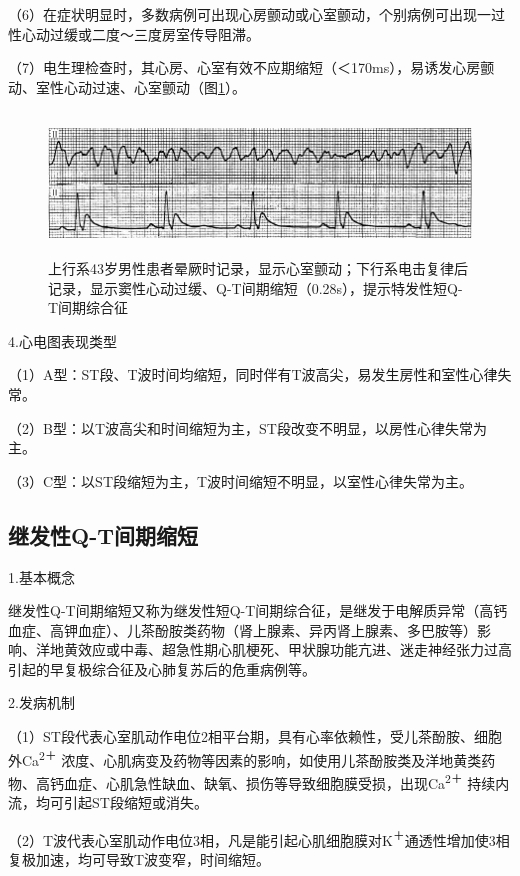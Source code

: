 （6）在症状明显时，多数病例可出现心房颤动或心室颤动，个别病例可出现一过性心动过缓或二度～三度房室传导阻滞。

（7）电生理检查时，其心房、心室有效不应期缩短（＜170ms），易诱发心房颤动、室性心动过速、心室颤动（图\ref{fig7-4}）。

\begin{figure}[!htbp]
 \centering
 \includegraphics[width=5.78125in,height=1.48958in]{./images/Image00117.jpg}
 \captionsetup{justification=centering}
 \caption{上行系43岁男性患者晕厥时记录，显示心室颤动；下行系电击复律后记录，显示窦性心动过缓、Q-T间期缩短（0.28s），提示特发性短Q-T间期综合征}
 \label{fig7-4}
  \end{figure} 

4.心电图表现类型

（1）A型：ST段、T波时间均缩短，同时伴有T波高尖，易发生房性和室性心律失常。

（2）B型：以T波高尖和时间缩短为主，ST段改变不明显，以房性心律失常为主。

（3）C型：以ST段缩短为主，T波时间缩短不明显，以室性心律失常为主。

\protect\hypertarget{text00013.htmlux5cux23subid106}{}{}

\subsection{继发性Q-T间期缩短}

1.基本概念

继发性Q-T间期缩短又称为继发性短Q-T间期综合征，是继发于电解质异常（高钙血症、高钾血症）、儿茶酚胺类药物（肾上腺素、异丙肾上腺素、多巴胺等）影响、洋地黄效应或中毒、超急性期心肌梗死、甲状腺功能亢进、迷走神经张力过高引起的早复极综合征及心肺复苏后的危重病例等。

2.发病机制

（1）ST段代表心室肌动作电位2相平台期，具有心率依赖性，受儿茶酚胺、细胞外Ca\textsuperscript{2＋}
浓度、心肌病变及药物等因素的影响，如使用儿茶酚胺类及洋地黄类药物、高钙血症、心肌急性缺血、缺氧、损伤等导致细胞膜受损，出现Ca\textsuperscript{2＋}
持续内流，均可引起ST段缩短或消失。

（2）T波代表心室肌动作电位3相，凡是能引起心肌细胞膜对K\textsuperscript{＋}通透性增加使3相复极加速，均可导致T波变窄，时间缩短。

